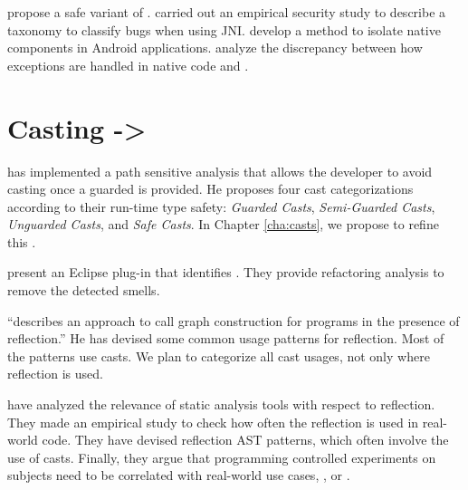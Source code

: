 \cite{tanSafeJavaNative2006} propose a safe variant of \jni{}.
\cite{tanEmpiricalSecurityStudy2008,kondohFindingBugsJava2008} carried out an empirical security study to describe a taxonomy to classify bugs when using JNI.
\cite{sunNativeGuardProtectingAndroid2014} develop a method to isolate native components in Android applications.
\cite{liFindingBugsExceptional2009} analyze the discrepancy between how exceptions are handled in native code and \java{}.


\section{Casting -> }
\label{sec:lr:casting}

\cite{wintherGuardedTypePromotion2011} has implemented a path sensitive analysis that allows the developer to avoid casting once a guarded  is provided.
He proposes four cast categorizations according to their run-time type safety: \emph{Guarded Casts}, \emph{Semi-Guarded Casts}, \emph{Unguarded Casts}, and \emph{Safe Casts}.
In Chapter \ref{cha:casts}, we propose to refine this
.

\cite{tsantalisJDeodorantIdentificationRemoval2008} present an Eclipse plug-in that identifies
.
They provide refactoring analysis to remove the detected smells.

\cite{livshitsImprovingSoftwareSecurity2006,livshitsReflectionAnalysisJava2005} ``describes an approach to call graph construction for \java{} programs in the presence of reflection.''
He has devised some common usage patterns for reflection.
Most of the patterns use casts.
We plan to categorize all cast usages, not only where reflection is used.

\cite{landmanChallengesStaticAnalysis2017} have analyzed the relevance of static analysis tools with respect to reflection.
They made an empirical study to check how often the reflection \api{} is used in real-world code.
They have devised reflection AST patterns, which often involve the use of casts.
Finally, they argue that programming controlled experiments on subjects need to be correlated with real-world use cases, \eg{}, \github{} or \mavencentral{}.


